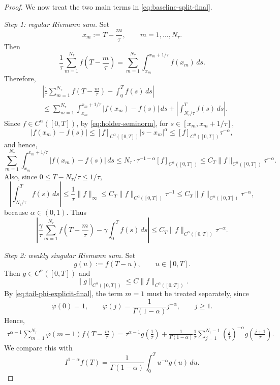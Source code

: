 \documentclass[letterpaper]{article}
\numberwithin{equation}{section}
\theoremstyle{definition}
\theoremstyle{remark}
\begin{document}
\begin{proof}
We now treat the two main terms in \eqref{eq:baseline-split-final}.

\medskip
\noindent
\emph{Step 1: regular Riemann sum.}
Set
\[
x_m:=T-\frac{m}{\tau},\qquad m=1,\dots,N_\tau.
\]
Then
\[
\frac{1}{\tau}\sum_{m=1}^{N_\tau}f\!\left(T-\frac{m}{\tau}\right)
=
\sum_{m=1}^{N_\tau}\int_{x_m}^{x_m+1/\tau} f(x_m)\,ds.
\]
Therefore,
\begin{align*}
&\left|
\frac{1}{\tau}\sum_{m=1}^{N_\tau}f\!\left(T-\frac{m}{\tau}\right)
-\int_0^T f(s)\,ds
\right|
\\
&\le
\sum_{m=1}^{N_\tau}
\int_{x_m}^{x_m+1/\tau}|f(x_m)-f(s)|\,ds
+
\left|\int_{N_\tau/\tau}^{T}f(s)\,ds\right|.
\end{align*}
Since $f\in C^\alpha([0,T])$, by \eqref{eq:holder-seminorm}, for
$s\in[x_m,x_m+1/\tau]$,
\[
  |f(x_m)-f(s)|
  \le [f]_{C^\alpha([0,T])}|s-x_m|^\alpha
  \le [f]_{C^\alpha([0,T])}\tau^{-\alpha},
\]
and hence,
\[
\sum_{m=1}^{N_\tau}
\int_{x_m}^{x_m+1/\tau}|f(x_m)-f(s)|\,ds
\le
N_\tau\cdot \tau^{-1-\alpha}[f]_{C^\alpha([0,T])}
\le C_T\|f\|_{C^\alpha([0,T])}\tau^{-\alpha}.
\]
Also, since $0\le T-N_\tau/\tau\le 1/\tau$,
\[
\left|\int_{N_\tau/\tau}^{T}f(s)\,ds\right|
\le
\frac{1}{\tau}\|f\|_\infty
\le
C_T\|f\|_{C^\alpha([0,T])}\tau^{-1}
\le
C_T\|f\|_{C^\alpha([0,T])}\tau^{-\alpha},
\]
because $\alpha\in(0,1)$. Thus
\begin{equation}\label{eq:regular-riemann-final}
  \left|
    \frac{\gamma}{\tau}\sum_{m=1}^{N_\tau}f\!\left(T-\frac{m}{\tau}\right)
    -\gamma\int_0^T f(s)\,ds
  \right|
  \le C_T\|f\|_{C^{\alpha}([0,T])}\tau^{-\alpha}.
\end{equation}

\medskip
\noindent
\emph{Step 2: weakly singular Riemann sum.}
Set
\[
  g(u):=f(T-u),\qquad u\in[0,T].
\]
Then $g\in C^{\alpha}([0,T])$ and
\[
  \|g\|_{C^{\alpha}([0,T])}\le C\|f\|_{C^{\alpha}([0,T])}.
\]
By \eqref{eq:tail-phi-explicit-final}, the term $m=1$ must be treated separately, since
\[
  \overline\varphi(0)=1,
  \qquad
  \overline\varphi(j)=\frac{1}{\Gamma(1-\alpha)}j^{-\alpha},
  \qquad j\ge1.
\]
Hence,
\begin{equation}\label{eq:singular-sum-decomp-final}
\begin{aligned}
  \tau^{\alpha-1}\sum_{m=1}^{N_\tau}\overline\varphi(m-1)
  f\!\left(T-\frac{m}{\tau}\right)
  =
  \tau^{\alpha-1}g\!\left(\frac1\tau\right)
  +
  \frac{1}{\Gamma(1-\alpha)}\frac1\tau
  \sum_{j=1}^{N_\tau-1}\left(\frac{j}{\tau}\right)^{-\alpha}
  g\!\left(\frac{j+1}{\tau}\right).
\end{aligned}
\end{equation}
We compare this with
\[
  I^{1-\alpha}f(T)
  =
  \frac{1}{\Gamma(1-\alpha)}\int_0^T u^{-\alpha}g(u)\,du.
\]


\end{proof}
\end{document}

